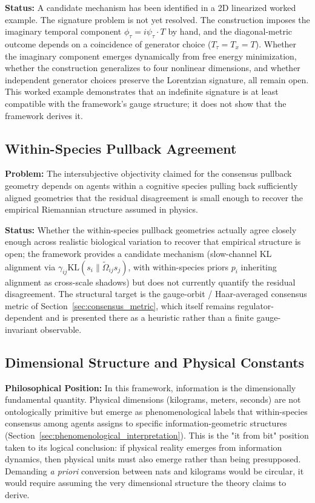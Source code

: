 \documentclass[11pt]{article}
\begin{document}
\textbf{Status:} A candidate mechanism has been identified in a 2D linearized worked example. The signature problem is not yet resolved. The construction imposes the imaginary temporal component $\phi_\tau = i\psi_\tau \cdot T$ by hand, and the diagonal-metric outcome depends on a coincidence of generator choice ($T_\tau = T_x = T$). Whether the imaginary component emerges dynamically from free energy minimization, whether the construction generalizes to four nonlinear dimensions, and whether independent generator choices preserve the Lorentzian signature, all remain open. This worked example demonstrates that an indefinite signature is at least compatible with the framework's gauge structure; it does not show that the framework derives it.

\subsection{Within-Species Pullback Agreement}

\textbf{Problem:} The intersubjective objectivity claimed for the consensus pullback geometry depends on agents within a cognitive species pulling back sufficiently aligned geometries that the residual disagreement is small enough to recover the empirical Riemannian structure assumed in physics.

\textbf{Status:} Whether the within-species pullback geometries actually agree closely enough across realistic biological variation to recover that empirical structure is open; the framework provides a candidate mechanism (slow-channel KL alignment via $\gamma_{ij}\mathrm{KL}(s_i \| \tilde\Omega_{ij} s_j)$, with within-species priors $p_i$ inheriting alignment as cross-scale shadows) but does not currently quantify the residual disagreement. The structural target is the gauge-orbit / Haar-averaged consensus metric of Section~\ref{sec:consensus_metric}, which itself remains regulator-dependent and is presented there as a heuristic rather than a finite gauge-invariant observable.

\subsection{Dimensional Structure and Physical Constants}
\label{sec:dimensional_structure}

\textbf{Philosophical Position:} In this framework, information is the dimensionally fundamental quantity. Physical dimensions (kilograms, meters, seconds) are not ontologically primitive but emerge as phenomenological labels that within-species consensus among agents assigns to specific information-geometric structures (Section~\ref{sec:phenomenological_interpretation}). This is the "it from bit" position taken to its logical conclusion: if physical reality emerges from information dynamics, then physical units must also emerge rather than being presupposed. Demanding \emph{a priori} conversion between nats and kilograms would be circular, it would require assuming the very dimensional structure the theory claims to derive.
\end{document}
